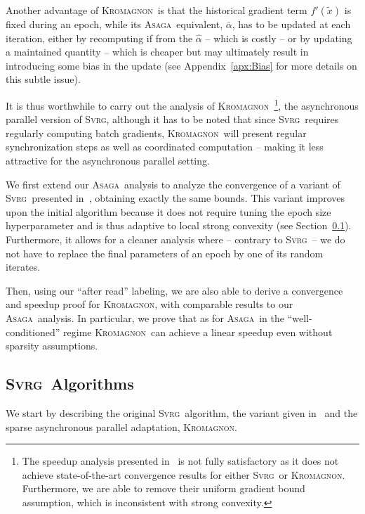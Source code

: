 \documentclass[twoside, 11pt]{article}
\newcommand{\ASAGA}{\textsc{Asaga}}
\newcommand{\SVRG}{\textsc{Svrg}}
\newcommand{\KROMAGNON}{\textsc{Kromagnon}}
\begin{document}
Another advantage of \KROMAGNON\ is that the historical gradient term $f'(\tilde x)$ is fixed during an epoch, while its \ASAGA\ equivalent, $\bar \alpha$, has to be updated at each iteration, either by recomputing if from the $\hat \alpha$ -- which is costly -- or by updating a maintained quantity -- which is cheaper but may ultimately result in introducing some bias in the update (see Appendix~\ref{apx:Bias} for more details on this subtle issue).

It is thus worthwhile to carry out the analysis of \KROMAGNON~\citep{mania}\footnote{The speedup analysis presented in~\citet{mania} is not fully satisfactory as it does not achieve state-of-the-art convergence results for either \SVRG\ or \KROMAGNON. Furthermore, we are able to remove their uniform gradient bound assumption, which is inconsistent with strong convexity.}, the asynchronous parallel version of \SVRG, although it has to be noted that since \SVRG\ requires regularly computing batch gradients, \KROMAGNON\ will present regular synchronization steps as well as coordinated computation -- making it less attractive for the asynchronous parallel setting.

We first extend our \ASAGA\ analysis to analyze the convergence of a variant of \SVRG\ presented in~\citet{qsaga}, obtaining exactly the same bounds.
This variant improves upon the initial algorithm because it does not require tuning the epoch size hyperparameter and is thus adaptive to local strong convexity (see Section~\ref{ssec:svrgalgos}).
Furthermore, it allows for a cleaner analysis where -- contrary to \SVRG\ -- we do not have to replace the final parameters of an epoch by one of its random iterates.

Then, using our ``after read'' labeling, we are also able to derive a convergence and speedup proof for \KROMAGNON, with comparable results to our \ASAGA\ analysis.
In particular, we prove that as for \ASAGA\, in the ``well-conditioned'' regime \KROMAGNON\ can achieve a linear speedup even without sparsity assumptions.

\subsection{\SVRG\ Algorithms}\label{ssec:svrgalgos}
We start by describing the original \SVRG\ algorithm, the variant given in~\citet{qsaga} and the sparse asynchronous parallel adaptation, \KROMAGNON.
\end{document}
